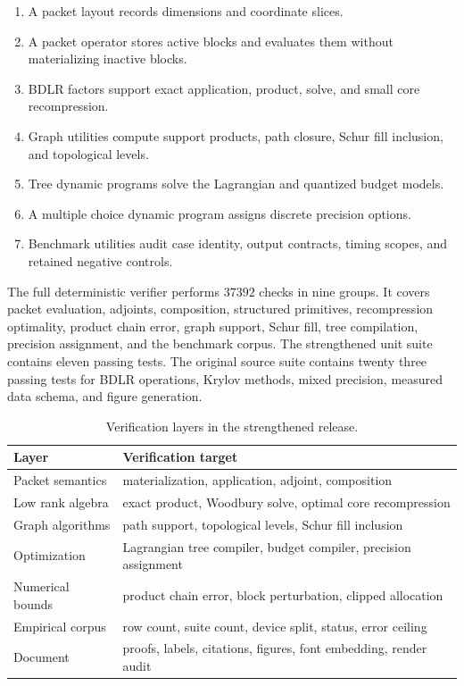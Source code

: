 \documentclass{aomart}
\theoremstyle{definition}
\theoremstyle{remark}
\begin{document}
\begin{enumerate}
\item A packet layout records dimensions and coordinate slices.
\item A packet operator stores active blocks and evaluates them without materializing inactive blocks.
\item BDLR factors support exact application, product, solve, and small core recompression.
\item Graph utilities compute support products, path closure, Schur fill inclusion, and topological levels.
\item Tree dynamic programs solve the Lagrangian and quantized budget models.
\item A multiple choice dynamic program assigns discrete precision options.
\item Benchmark utilities audit case identity, output contracts, timing scopes, and retained negative controls.
\end{enumerate}

The full deterministic verifier performs \(37392\) checks in nine groups. It covers packet evaluation, adjoints, composition, structured primitives, recompression optimality, product chain error, graph support, Schur fill, tree compilation, precision assignment, and the benchmark corpus. The strengthened unit suite contains eleven passing tests. The original source suite contains twenty three passing tests for BDLR operations, Krylov methods, mixed precision, measured data schema, and figure generation.

\begin{table}[t]
\centering
\small
\begin{tabular}{>{\raggedright\arraybackslash}p{}>{\raggedright\arraybackslash}p{}}
\toprule
Layer & Verification target \\
\midrule
Packet semantics & materialization, application, adjoint, composition \\
Low rank algebra & exact product, Woodbury solve, optimal core recompression \\
Graph algorithms & path support, topological levels, Schur fill inclusion \\
Optimization & Lagrangian tree compiler, budget compiler, precision assignment \\
Numerical bounds & product chain error, block perturbation, clipped allocation \\
Empirical corpus & row count, suite count, device split, status, error ceiling \\
Document & proofs, labels, citations, figures, font embedding, render audit \\
\bottomrule
\end{tabular}
\caption{Verification layers in the strengthened release.}
\label{tab:verification_layers}
\end{table}
\end{document}
